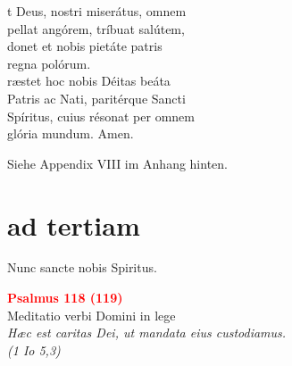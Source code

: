\vspace{0.3cm}




\def\greinitialformat#1{{\fontsize{40}{40}\selectfont #1}}
\gresetfirstlineaboveinitial{\small \textcolor{red}{æstate}}{}
\setaboveinitialseparation{0.72mm}

\vspace{0.3cm}
\begin{centering}


t Deus, nostri miserátus, omnem\\
pellat angórem, tríbuat salútem, \\
donet et nobis pietáte patris\\
	regna polórum.\\
	
	
ræstet hoc nobis Déitas beáta\\
Patris ac Nati, paritérque Sancti\\
Spíritus, cuius résonat per omnem\\
	glória mundum. Amen.


\end{centering}

\vspace{0.3cm}


\vspace{0.6cm}


Siehe Appendix VIII im Anhang hinten.

\medskip

\section[horae minores]{ad tertiam}

 Nunc sancte nobis Spiritus.
\vspace{0.3cm}

\begin{center}
 \textcolor{red}{\large \bf Psalmus 118 (119)}\\
Meditatio verbi Domini in lege\\
\textit{\small Hæc est caritas Dei, ut mandata eius custodiamus.\\(1 Io 5,3)}
\end{center}

